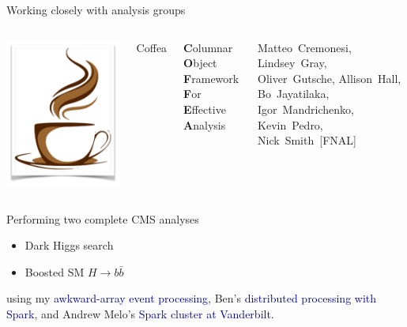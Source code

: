 \documentclass[aspectratio=169]{beamer}
\begin{document}
\begin{frame}{Working closely with analysis groups}
\vspace{0.75 cm}
\begin{columns}
\includegraphics[width=\linewidth]{coffea-logo.png}

\hspace{-0.2 cm}\Huge Coffea

\vspace{0.25 cm}
\large {\bf C}olumnar {\bf O}bject {\bf F}ramework {\bf F}or {\bf E}ffective {\bf A}nalysis

\vspace{0.25 cm}
\normalsize Matteo~Cremonesi, Lindsey~Gray, Oliver~Gutsche, Allison~Hall, Bo~Jayatilaka, Igor~Mandrichenko, Kevin~Pedro, Nick~Smith~[FNAL]
\end{columns}

\vspace{0.25 cm}
\begin{center}
\begin{minipage}{0.85\linewidth}
\large Performing two complete CMS analyses
\begin{itemize}
\item Dark Higgs search
\item Boosted SM $H \to b\bar{b}$
\end{itemize}
using my \textcolor{darkblue}{awkward-array event processing}, Ben's \textcolor{darkblue}{distributed processing with Spark}, and Andrew Melo's \textcolor{darkblue}{Spark cluster at Vanderbilt}.
\end{minipage}
\end{center}
\end{frame}
\end{document}
